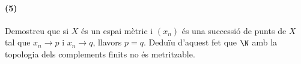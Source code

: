 \paragraph{(5)}
Demostreu que si $X$ és un espai mètric i $(x_n)$ és una successió de punts de $X$ tal que $x_n \to p$ i $x_n \to q$, llavors $p = q$. Deduïu d'aquest fet que $\N$ amb la topologia dels complements finits no és metritzable.\\
